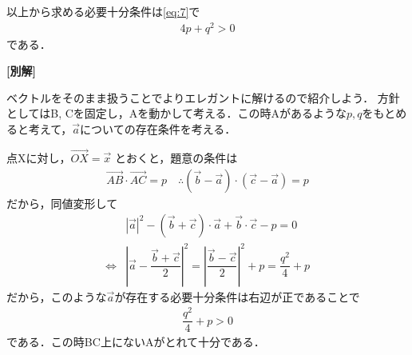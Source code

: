 \documentclass[../../main.tex]{subfiles}
\begin{document}
以上から求める必要十分条件は\cref{eq:7}で
\begin{align}
  4p + q^2 > 0
\end{align}
である．

{\bf [別解]}

ベクトルをそのまま扱うことでよりエレガントに解けるので紹介しよう．
方針としてはB, Cを固定し，Aを動かして考える．この時Aがあるような$p, q$をもとめると考えて，$\vec{a}$についての存在条件を考える．

点Xに対し，$\overrightarrow{OX} = \vec{x}$ とおくと，題意の条件は
\begin{align}
  \overrightarrow{AB}\cdot\overrightarrow{AC} = p
  \quad \therefore
  (\vec{b} - \vec{a}) \cdot (\vec{c} - \vec{a}) = p
\end{align}
だから，同値変形して
\begin{align}
  & |\vec{a}|^2 - (\vec{b} + \vec{c}) \cdot \vec{a} + \vec{b} \cdot \vec{c} - p = 0 \\
  \iff
  & \left| \vec{a} - \dfrac{\vec{b} + \vec{c}}{2} \right|^2
  = \left| \dfrac{\vec{b} - \vec{c}}{2} \right|^2 + p
  = \dfrac{q^2}{4} + p
\end{align}
だから，このような$\vec{a}$が存在する必要十分条件は右辺が正であることで
\begin{align}
  \dfrac{q^2}{4} + p > 0
\end{align}
である．この時BC上にないAがとれて十分である．
\end{document}
